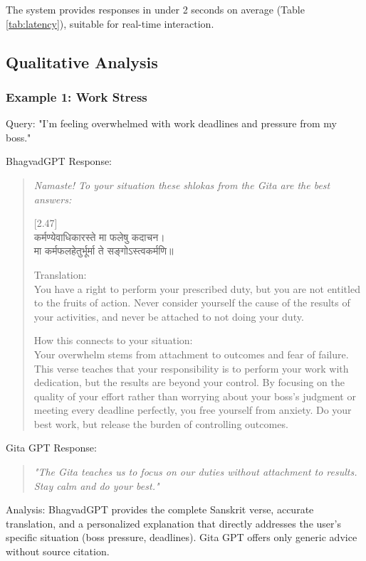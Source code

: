 \documentclass[conference]{IEEEtran}
\begin{document}
The system provides responses in under 2 seconds on average (Table \ref{tab:latency}), suitable for real-time interaction.

\subsection{Qualitative Analysis}

\subsubsection{Example 1: Work Stress}

Query: "I'm feeling overwhelmed with work deadlines and pressure from my boss."

BhagvadGPT Response:
\begin{quote}
\textit{Namaste! To your situation these shlokas from the Gita are the best answers:}

[2.47]\\
कर्मण्येवाधिकारस्ते मा फलेषु कदाचन।\\
मा कर्मफलहेतुर्भूर्मा ते सङ्गोऽस्त्वकर्मणि॥

Translation:\\
You have a right to perform your prescribed duty, but you are not entitled to the fruits of action. Never consider yourself the cause of the results of your activities, and never be attached to not doing your duty.

How this connects to your situation:\\
Your overwhelm stems from attachment to outcomes and fear of failure. This verse teaches that your responsibility is to perform your work with dedication, but the results are beyond your control. By focusing on the quality of your effort rather than worrying about your boss's judgment or meeting every deadline perfectly, you free yourself from anxiety. Do your best work, but release the burden of controlling outcomes.
\end{quote}

Gita GPT Response:
\begin{quote}
\textit{"The Gita teaches us to focus on our duties without attachment to results. Stay calm and do your best."}
\end{quote}

Analysis: BhagvadGPT provides the complete Sanskrit verse, accurate translation, and a personalized explanation that directly addresses the user's specific situation (boss pressure, deadlines). Gita GPT offers only generic advice without source citation.
\end{document}

